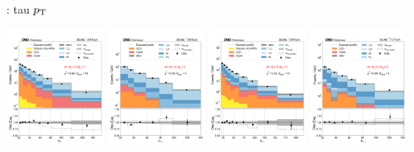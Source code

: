 \begin{frame}{}
\begin{tcolorbox}[colframe=NUpurple]{ \cet: tau $p_{\mathrm{T}}$}
\begin{center}
            \includegraphics[width=0.24\textwidth]{chapters/Analysis/sectionStatisticalAnalysis/figures/fit/etau_cat_eq2_eq1}
            \includegraphics[width=0.24\textwidth]{chapters/Analysis/sectionStatisticalAnalysis/figures/fit/etau_cat_eq2_eq2}
            \includegraphics[width=0.24\textwidth]{chapters/Analysis/sectionStatisticalAnalysis/figures/fit/etau_cat_gt3_eq1}
            \includegraphics[width=0.24\textwidth]{chapters/Analysis/sectionStatisticalAnalysis/figures/fit/etau_cat_gt3_gt2}
        \end{center}
    \end{tcolorbox}
\end{frame}

